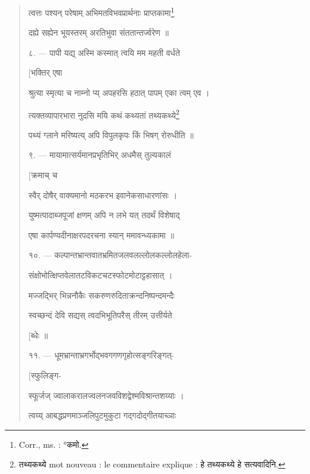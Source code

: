 \documentclass[a4paper, 11pt, oneside, french, landscape, twocolumn]{article}
\begin{document}
\begin{quotation}
\texthindi{त्वत्तः पश्यन् परेषाम् अभिमतविभवप्रार्थनाः प्राप्तकामा\footnote{Corr., ms. : °\texthindi{कमो}.}}

\texthindi{दह्ये सह्येन भूयस्तरम् अरतिभुवा संततान्तर्ज्वरेण ॥}

\bigskip

\texthindi{८}. --- \texthindi{पापी यद्य् अस्मि कस्मात् त्वयि मम महती वर्धते}

\hspace*{55mm}\texthindi{[भक्तिर् एषा}

\texthindi{श्रुत्या स्मृत्या च नाम्नो प्य् अपहरसि हठात् पापम् एका त्वम् एव ।}

\texthindi{त्यक्तव्यापारभारा नुदसि मयि कथं कथ्यतां तथ्यकथ्ये\footnote{\texthindi{तथ्यकथ्ये} mot nouveau : le commentaire explique : \texthindi{हे तथ्यकथ्ये हे सत्यवादिनि.}}}

\texthindi{पथ्यं ग्लाने मरिष्यत्य् अपि विपुलकृपः किं भिषग् रोरुधीति ॥}

\bigskip

\texthindi{९}. --- \texthindi{मायामात्सर्यमानप्रभृतिभिर् अधमैस् तुल्यकालं}

\hspace*{55mm}\texthindi{[क्रमाच् च}

\texthindi{स्वैर् दोषैर् वाक्यमानो मठकरभ इवानेकसाधारणांसः ।}

\texthindi{युष्मत्पादाब्जपूजां क्षणम् अपि न लभे यत् तदर्थं विशेषाद्}

\texthindi{एषा कार्पण्यदीनाक्षरपदरचना स्यान् ममावन्ध्यकामा ॥}

\bigskip

\texthindi{१०}. --- \texthindi{कल्पान्तभ्रान्तवातभ्रमितजलवलल्लोलकल्लोलहेला-}

\texthindi{संक्षोभोत्क्षिप्तवेलातटविकटचटस्फोटमोटाट्टहासात् ।}

\texthindi{मज्जद्भिर् भिन्ननौकैः सकरुणरुदिताक्रन्दनिष्पन्दमन्दैः}

\texthindi{स्वच्छन्दं देवि सद्यस् त्वदभिभूतिपरैस् तीरम् उत्तीर्यते}

\hspace*{55mm}\texthindi{[ब्धेः ॥}

\bigskip

\texthindi{११}. --- \texthindi{धूमभ्रान्ताभ्रगर्भोद्भवगगणगृहोत्सङ्गरिङ्गत्-}

\hspace*{55mm}\texthindi{[स्फुलिङ्ग-}

\texthindi{स्फूर्जज् ज्वालाकरालज्वलनजवविशद्वेश्मविश्रान्तशय्याः ।}

\texthindi{त्वय्य् आबद्धप्रणमाञ्जलिपुटमुकुटा गद्गदोद्गीतयाच्ञाः}


\end{quotation}
\end{document}
